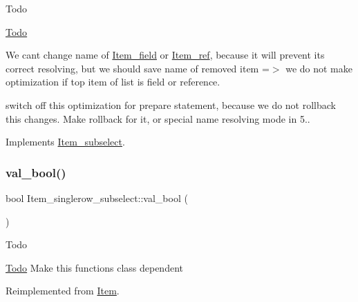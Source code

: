 \begin{DoxyRefDesc}{Todo}
\item[\mbox{\hyperlink{todo__todo000036}{Todo}}]
\begin{DoxyItemize}
\item We cant change name of \mbox{\hyperlink{classItem__field}{Item\+\_\+field}} or \mbox{\hyperlink{classItem__ref}{Item\+\_\+ref}}, because it will prevent it\textquotesingle{}s correct resolving, but we should save name of removed item =$>$ we do not make optimization if top item of list is field or reference.
\item switch off this optimization for prepare statement, because we do not rollback this changes. Make rollback for it, or special name resolving mode in 5.. 
\end{DoxyItemize}\end{DoxyRefDesc}


Implements \mbox{\hyperlink{classItem__subselect}{Item\+\_\+subselect}}.

\mbox{\label{classItem__singlerow__subselect_a9e8de5972977f88a0354b36a05862a68}} 
\subsubsection{\texorpdfstring{val\+\_\+bool()}{val\_bool()}}
{\footnotesize\ttfamily bool Item\+\_\+singlerow\+\_\+subselect\+::val\+\_\+bool (\begin{DoxyParamCaption}{ }\end{DoxyParamCaption})\hspace{0.3cm}{\ttfamily [virtual]}}

\begin{DoxyRefDesc}{Todo}
\item[\mbox{\hyperlink{todo__todo000026}{Todo}}]Make this functions class dependent \end{DoxyRefDesc}


Reimplemented from \mbox{\hyperlink{classItem_a875594d2b9d99ccff3863bfd435828f0}{Item}}.

\mbox{\label{classItem__singlerow__subselect_a0f7547c32eca8cc13e5670aca3fd5e86}} 
